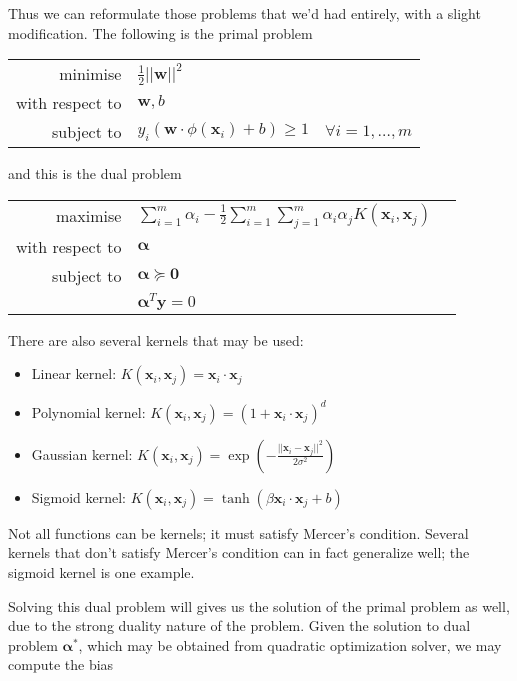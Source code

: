 \documentclass[11pt]{article}%
\def\ds{\displaystyle}
\def\bs{\boldsymbol}
\begin{document}
Thus we can reformulate those problems that we'd had entirely, with a slight modification. The following is the primal problem

\begin{center}
\begin{tabular}{rll}
minimise & \multicolumn{2}{l}{$\ds \frac12 ||\bs w||^2$} \\
with respect to & \multicolumn{2}{l}{$\bs w, b$} \\
subject to & $y_i(\bs w\cdot \phi(\bs x_i)+b) \geq 1 $ & $\forall i=1,\ldots,m$
\end{tabular}
\end{center}

and this is the dual problem

\begin{center}
\begin{tabular}{rll}
maximise & $\ds \sum_{i=1}^m\alpha_i-\frac12\sum_{i=1}^m\sum_{j=1}^m \alpha_i\alpha_jK(\bs x_i,\bs x_j)$ \\
with respect to & $\bs\alpha$ \\
subject to & $\bs\alpha\succeq\bs 0$ \\
 & $\bs\alpha^T\textbf{y}=0$
\end{tabular}
\end{center}

There are also several kernels that may be used:

\begin{itemize}
\item Linear kernel: $K(\bs x_i, \bs x_j) = \bs x_i \cdot \bs x_j$
\item Polynomial kernel: $K(\bs x_i, \bs x_j) = (1 + \bs x_i \cdot \bs x_j)^d$
\item Gaussian kernel: $\ds K(\bs x_i, \bs x_j) = \exp\left(-\frac{||\bs x_i-\bs x_j||^2}{2\sigma^2}\right)$
\item Sigmoid kernel: $\ds K(\bs x_i, \bs x_j) = \tanh(\beta \bs x_i \cdot \bs x_j + b)$
\end{itemize}

Not all functions can be kernels; it must satisfy Mercer's condition. Several kernels that don't satisfy Mercer's condition can in fact generalize well; the sigmoid kernel is one example.

Solving this dual problem will gives us the solution of the primal problem as well, due to the strong duality nature of the problem. Given the solution to dual problem $\bs\alpha^*$, which may be obtained from quadratic optimization solver, we may compute the bias
\end{document}
